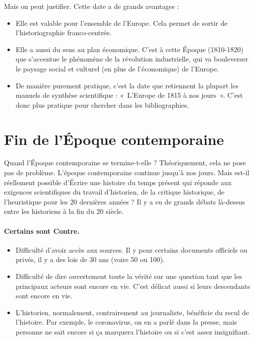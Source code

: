 \documentclass[12pt]{report}
\begin{document}
Mais on peut justifier. Cette date a de grands avantages : 
\begin{itemize}
	\item Elle est valable pour l'ensemble de l'Europe. Cela permet de sortir de l'historiographie franco-centrée.
	\item Elle a aussi du sens au plan économique. C'est à cette Époque (1810-1820) que s'accentue le phénomène de la révolution industrielle, qui va bouleverser le paysage social et culturel (en plus de l'économique) de l'Europe.  
	\item De manière purement pratique, c'est la date que retiennent la plupart les manuels de synthèse scientifique  : «~L'Europe de 1815 à nos jours~». C'est donc plus pratique pour chercher dans les bibliographies.
\end{itemize}



\section*{Fin de l'Époque contemporaine}

Quand l'Époque contemporaine se termine-t-elle ? Théoriquement, cela ne pose pas de problème. L'époque contemporaine continue jusqu'à nos jours. Mais est-il réellement possible d'Écrire une histoire du temps présent qui réponde aux exigences scientifiques du travail d'historien, de la critique historique, de l'heuristique pour les 20 dernières années ? Il y a eu de grands débats là-dessus entre les historiens à la fin du 20 siècle.

\paragraph{Certains sont Contre.}
\begin{itemize}
	\item Difficulté d'avoir accès aux sources. Il y pour certains documents officiels ou privés, il y a des lois de 30 ans (voire 50 ou 100).
	\item Difficulté de dire ouvertement toute la vérité sur une question tant que les principaux acteurs sont encore en vie. C'est délicat aussi si leurs descendants sont encore en vie.
	\item L'historien, normalement, contrairement au journaliste, bénéficie du recul de l'histoire. Par exemple, le coronavirus, on en a parlé dans la presse, mais personne ne sait encore si ça marquera l'histoire ou si c'est assez insignifiant.
\end{itemize}
\end{document}
